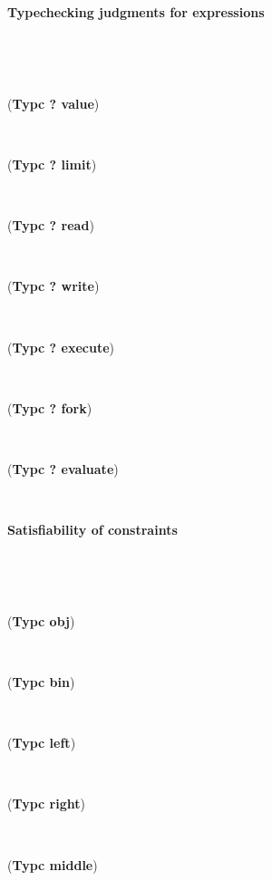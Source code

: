 \documentclass{sigplanconf}
\def\upbracketfill{}
\def\downbracketfill{}
\newcommand{\cenvvv}[3]{\vspace{0.8mm}
\begin{flushleft}
\parbox{8.4cm}{{\bf #1} }
\\
\parbox{8.4cm}{\downbracketfill}
\\
\vspace{-0.2cm}
\end{flushleft}
#3
\begin{flushleft}
\parbox{8.4cm}{\upbracketfill}
\end{flushleft}}
\begin{document}
\begin{figure}
\cenvvv{Typechecking judgments for expressions}{\Gamma \vdash f : T \rhd \Gamma'}{
({\bf Typc ? value}) \vspace{-2mm}

~

({\bf Typc ? limit}) \vspace{-1mm}

~

({\bf Typc ? read}) \vspace{-1mm}

~

({\bf Typc ? write}) \vspace{-1mm}

~

({\bf Typc ? execute}) \vspace{-1mm}

~

({\bf Typc ? fork}) \vspace{-1mm}

~

({\bf Typc ? evaluate}) \vspace{-1mm}

~

}
\vspace{-2mm}
\cenvvv{Satisfiability of constraints}{\Gamma \vdash \diamond}{
({\bf Typc  obj}) \vspace{-2mm}

~

({\bf Typc  bin}) \vspace{-1mm}

~

({\bf Typc  left}) \vspace{-1mm}

~

({\bf Typc  right}) \vspace{-1mm}

~

({\bf Typc  middle}) \vspace{-1mm}

~

}
\end{figure}
\end{document}
